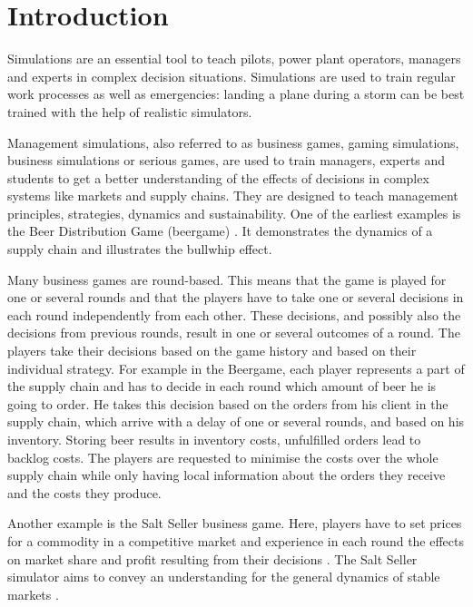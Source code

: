 \chapter{Introduction}
\label{cha:intro}

Simulations are an essential tool to teach pilots, power plant operators, managers and experts in complex decision situations. 
Simulations are used to train regular work processes as well as emergencies:
landing a plane during a storm can be best trained with the help of realistic simulators.

Management simulations, also referred to as business games, gaming simulations, business simulations or serious games, are used to train managers, experts and students to get a better understanding of the effects of decisions in complex systems like markets and supply chains. They are designed to teach management principles, strategies, dynamics and sustainability. 
One of the earliest examples is the Beer Distribution Game (beergame) \cite{JForrester1961,jarmain,beergame}.
It demonstrates the dynamics of a supply chain and illustrates the bullwhip effect.

Many business games are round-based. This means that the game is played for one or several rounds and that the players have to take one or several decisions in each round independently from each other. These decisions, and possibly also the decisions from previous rounds, result in one or several outcomes of a round. The players take their decisions based on the game history and based on their individual strategy. 
For example in the Beergame, each player represents a part of the supply chain and has to decide in each round which amount of beer he is going to order. He takes this decision based on the orders from his client in the supply chain, which arrive with a delay of one or several rounds, and based on his inventory. Storing beer results in inventory costs, unfulfilled orders lead to backlog costs. The players are requested to minimise the costs over the whole supply chain while only having local information about the orders they receive and the costs they produce.

Another example is the Salt Seller business game. Here, players have to set prices for a commodity in a competitive market and experience in each round the effects on market share and profit resulting from their decisions \cite{saltseller}. The Salt Seller simulator aims to convey an understanding for the general dynamics of stable markets \cite[p.90ff.]{sterman}.


